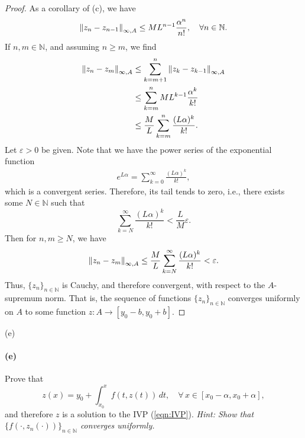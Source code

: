 \documentclass[12pt]{article}
\newenvironment{fullbox}{\begin{lrbox}{\savefullbox}\begin{minipage}{\dimexpr\textwidth-2\fboxsep\relax}}{\end{minipage}\end{lrbox}\begin{center}\framebox[\textwidth]{\usebox{\savefullbox}}\end{center}}
\newenvironment{pbox}[1][]{\begin{fullbox}\ifx#1\empty\else\paragraph{#1}\fi}{\end{fullbox}}
\theoremstyle{definition}
\newcommand{\N}{\mathbb{N}}
\newcommand{\eps}{\varepsilon}
\newcommand{\seq}[2]{\{#1\}_{#2\in\N}}
\begin{document}
\begin{proof}
    As a corollary of (c), we have
    \[
        \norm{z_n - z_{n-1}}_{\infty, A} \leq ML^{n-1}\frac{\alpha^n}{n!}, \quad \forall n \in \N.
    \]
    If $n, m \in \N$, and assuming $n \geq m$, we find
    \begin{align*}
        \norm{z_n - z_m}_{\infty, A}
            &\leq \sum_{k=m+1}^{n} \norm{z_k - z_{k-1}}_{\infty, A} \\
            &\leq \sum_{k=m}^{n} ML^{k-1}\frac{\alpha^k}{k!} \\
            &\leq \frac{M}{L} \sum_{k=m}^{n} \frac{(L\alpha)^k}{k!}.
    \end{align*}
    Let $\eps > 0$ be given. Note that we have the power series of the exponential function
    \begin{align*}
        e^{L\alpha} = \sum_{k=0}^{\infty} \frac{(L\alpha)^k}{k!},
    \end{align*}
    which is a convergent series. Therefore, its tail tends to zero, i.e., there exists some $N \in \N$ such that
    \[
        \sum_{k=N}^{\infty} \frac{(L\alpha)^k}{k!} < \frac{L}{M} \eps.
    \]
    Then for $n, m \geq N$, we have
    \[
        \norm{z_n - z_m}_{\infty, A}
            \leq \frac{M}{L} \sum_{k=N}^{\infty} \frac{(L\alpha)^k}{k!}
            < \eps.
    \]
    Thus, $\seq{z_n}{n}$ is Cauchy, and therefore convergent, with respect to the $A$-supremum norm. That is, the sequence of functions $\seq{z_n}{n}$ converges uniformly on $A$ to some function $z : A \to [y_0 - b, y_0+b]$.
    
    
\end{proof}




\newpage
\begin{pbox}[(e)]
    Prove that 
    \begin{equation}
    z(x) = y_0 + \int_{x_0}^x f(t,z(t))\,dt,\quad \forall\, x \in [x_0-\alpha,x_0+\alpha],
    \end{equation}
    and therefore $z$ is a solution to the IVP (\ref{eqn:IVP}).
    {\it Hint: Show that $\{f(\cdot,z_n(\cdot))\}_{n\in\N}$ converges uniformly.}
\end{pbox}
\end{document}
